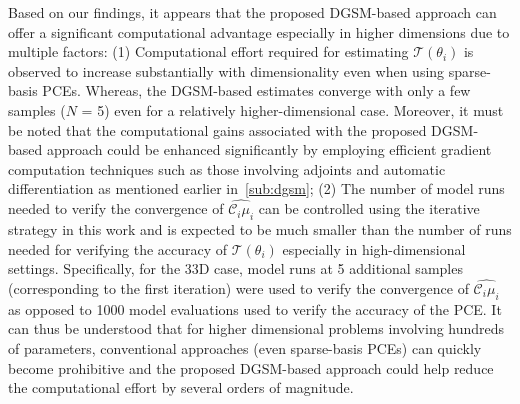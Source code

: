 {Based on our findings, it appears that the proposed DGSM-based approach can offer a significant
computational advantage especially in higher dimensions due to multiple factors: (1) Computational
effort required for estimating $\mathcal{T}(\theta_i)$ is observed to increase substantially with dimensionality even
when using sparse-basis PCEs. Whereas, the DGSM-based estimates converge
with only a few samples ($N$ = 5) even for a relatively higher-dimensional case. Moreover, it must be noted that
the computational gains associated with the proposed DGSM-based approach could be enhanced
significantly by employing efficient gradient computation techniques such as those involving adjoints
and automatic differentiation as mentioned earlier in~\ref{sub:dgsm}; (2) The number of model runs
needed to verify the convergence of $\widehat{\mathcal{C}_i\mu_i}$ can be controlled
using the iterative strategy in this work
and is expected to be much smaller than the number of runs needed for verifying the accuracy of  
$\mathcal{T}(\theta_i)$ especially in high-dimensional settings. Specifically, for the 33D case,
model runs at 5 additional samples (corresponding to the first iteration) were used to verify the
convergence of $\widehat{\mathcal{C}_i\mu_i}$ as opposed to 1000 model evaluations used to verify
the accuracy of the PCE. 
It can thus be understood that for higher dimensional problems involving hundreds of 
parameters, conventional approaches (even sparse-basis PCEs) can quickly become prohibitive and
the proposed DGSM-based approach could help
reduce the computational effort by several orders of magnitude. 

}
